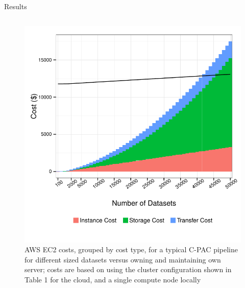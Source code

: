 \documentclass[final,hyperref={pdfpagelabels=false}]{beamer}
\begin{document}
\begin{frame}
\begin{columns}
\begin{column}{.5\textwidth}
{\begin{block}{Results}
\begin{column}{.47\textwidth}
              \begin{figure}
                  \includegraphics[width=.99\textwidth]{cpac-costs.pdf}
                  \caption{\label{fig:cpac-costs}AWS EC2 costs, grouped by cost type, for a typical C-PAC pipeline for different sized datasets versus owning and maintaining own server; costs are based on using the cluster configuration shown in Table 1 for the cloud, and a single compute node locally}
              \end{figure}
              \begin{figure}

\end{figure}
\end{column}
\end{block}}
\end{column}
\end{columns}
\end{frame}
\end{document}
